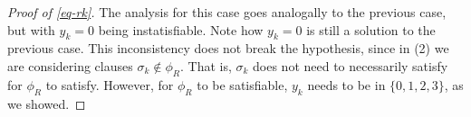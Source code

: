 \documentclass{amsart}
\theoremstyle{plain}
\numberwithin{equation}{section}
\begin{document}
\begin{proof}[Proof of \autoref{eq-rk}]
  The analysis for this case goes analogally to the previous case, but with $y_k=0$ being
  instatisfiable. Note how $y_k=0$ is still a solution to the previous case. This inconsistency
  does not break the hypothesis, since in (2) we are considering clauses $\sigma_k\not\in\phi_R$.
  That is, $\sigma_k$ does not need to necessarily satisfy for $\phi_R$ to satisfy. However, for
  $\phi_R$ to be satisfiable, $y_k$ needs to be in $\{0,1,2,3\}$, as we showed.
\end{proof}


\printbibliography[]
\end{document}

